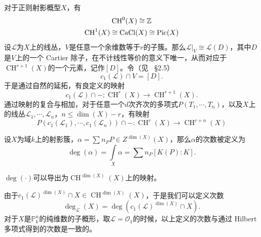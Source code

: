 \begin{remark}
对于正则射影概型$X$，有
\begin{gather}
\operatorname{CH}^0(X) \cong \mathbb{Z} \\
\operatorname{CH}^1(X) \cong \operatorname{CaCl}(X) \cong \operatorname{Pic}(X)
\end{gather}
设$\mathscr{L}$为$X$上的线丛，$V$是任意一个余维数等于$r$的子簇。那么$\mathscr{L}|_V \cong \mathscr{L}(D)$，其中$D$是$V$上的一个 Cartier 除子，在不计线性等价的意义下唯一，从而对应于$\operatorname{CH}^{r+1}(X)$的一个元素，记作$[D]$。令（见~ \S 2.5）
\begin{equation}
c_1(\mathscr{L})\cap V = [D].
\end{equation}
于是通过自然的延拓，有良定义的映射
\begin{equation}
c_1(\mathscr{L})\cap -: \operatorname{CH}^{r}(X) \longrightarrow \operatorname{CH}^{r+1}(X).
\end{equation}
通过映射的复合与相加，对于任意一个$d$次齐次的多项式$P(T_1,\cdots,T_n)$，以及$X$上的线丛$\mathscr{L}_1,\cdots,\mathscr{L}_n$，$n\leqslant \dim(X)-r$，有映射
\begin{equation}
P(c_1(\mathscr{L}_1),\cdots,c_1(\mathscr{L}_n)) \cap -: \operatorname{CH}^{r}(X) \longrightarrow \operatorname{CH}^{r+n}(X)
\end{equation}
\end{remark}

\begin{definition}
设$X$为域$k$上的射影簇，$\alpha = \sum n_PP\in Z^{\dim(X)}(X)$，那么$\alpha$的次数被定义为
\begin{equation}
\deg(\alpha) = \int\limits_{X} \alpha = \sum n_P[K(P):K].
\end{equation}
\end{definition}

\begin{remark}
$\deg(\cdot)$可以导出为$\operatorname{CH}^{\dim(X)}(X)$上的映射。
\end{remark}

\begin{remark}
由于$c_1(\mathscr{L})^{\dim(X)} \cap X \in \operatorname{CH}^{\dim(X)}(X)$，于是我们可以定义次数
\begin{equation}
\deg_{\mathscr{L}}(X) = \deg(c_1(\mathscr{L})^{\dim(X)} \cap X).
\end{equation}
对于$X$是$\mathbb{P}_k^n$的纯维数的子概形，取$\mathscr{L} = \mathcal{O}_1$的时候，以上定义的次数与通过 Hilbert 多项式得到的次数是一致的。
\end{remark}

